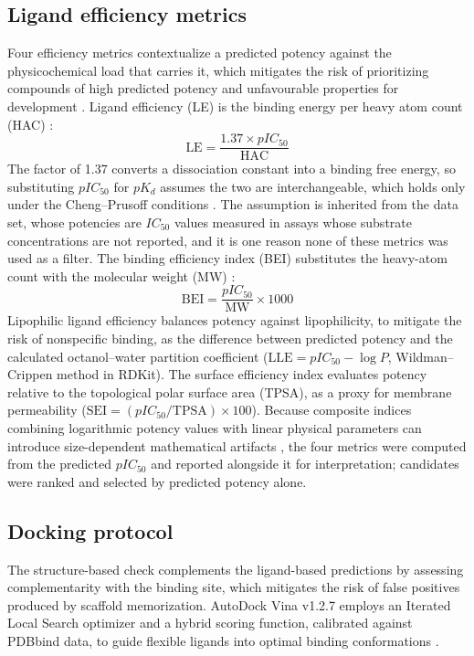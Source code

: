 \documentclass[a4paper,11pt]{article}
\begin{document}
\subsection*{Ligand efficiency metrics}

Four efficiency metrics contextualize a predicted potency against the physicochemical load that carries it, which
mitigates the risk of prioritizing compounds of high predicted potency and unfavourable properties for development
\citep{hopkins2004}. Ligand efficiency (LE) is the binding energy per heavy atom count (HAC) \citep{hopkins2014}:
\begin{equation}
	\text{LE} = \frac{1.37 \times pIC_{50}}{\text{HAC}}
\end{equation}
The factor of 1.37 converts a dissociation constant into a binding free energy, so substituting $pIC_{50}$ for $pK_d$
assumes the two are interchangeable, which holds only under the Cheng--Prusoff conditions \citep{cheng1973}. The
assumption is inherited from the data set, whose potencies are $IC_{50}$ values measured in assays whose substrate
concentrations are not reported, and it is one reason none of these metrics was used as a filter. The binding
efficiency index (BEI) substitutes the heavy-atom count with the molecular weight (MW) \citep{abad2005}:
\begin{equation}
	\text{BEI} = \frac{pIC_{50}}{\text{MW}} \times 1000
\end{equation}
Lipophilic ligand efficiency balances potency against lipophilicity, to mitigate the risk of nonspecific binding, as
the difference between predicted potency and the calculated octanol--water partition coefficient
($\text{LLE} = pIC_{50} - \log P$, Wildman--Crippen method in RDKit). The surface efficiency index evaluates potency
relative to the topological polar surface area (TPSA), as a proxy for membrane permeability
($\text{SEI} = (pIC_{50} / \text{TPSA}) \times 100$). Because composite indices combining logarithmic potency values
with linear physical parameters can introduce size-dependent mathematical artifacts \citep{shultz2013}, the four
metrics were computed from the predicted $pIC_{50}$ and reported alongside it for interpretation; candidates were
ranked and selected by predicted potency alone.

\subsection*{Docking protocol}

The structure-based check complements the ligand-based predictions by assessing complementarity with the binding site, which mitigates the risk of false positives produced by scaffold memorization. AutoDock Vina v1.2.7 \citep{rajesh2026, trott2009} employs an Iterated Local Search optimizer and a hybrid scoring function, calibrated against PDBbind data, to guide flexible ligands into optimal binding conformations \citep{eberhardt2021}.
\end{document}
